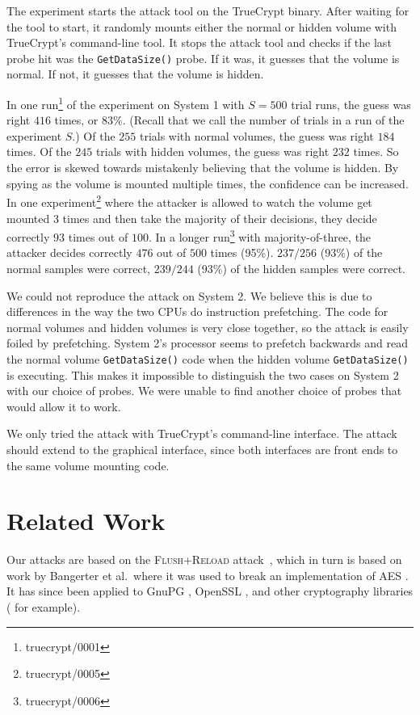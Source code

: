 \documentclass[letterpaper,twocolumn,10pt]{article}
\begin{document}
The experiment starts the attack tool on the TrueCrypt binary. After waiting for
the tool to start, it randomly mounts either the normal or hidden volume with
TrueCrypt's command-line tool. It stops the attack tool and checks if the last
probe hit was the \texttt{GetDataSize()} probe. If it was, it guesses that the
volume is normal. If not, it guesses that the volume is hidden.

In one run\footnote{truecrypt/0001} of the experiment on System 1 with $S=500$
trial runs, the guess was right $416$ times, or 83\%. (Recall that we call the
number of trials in a run of the experiment $S$.) Of the $255$ trials with
normal volumes, the guess was right $184$ times. Of the $245$ trials with hidden
volumes, the guess was right $232$ times. So the error is skewed towards
mistakenly believing that the volume is hidden. By spying as the volume is
mounted multiple times, the confidence can be increased. In one
experiment\footnote{truecrypt/0005} where the attacker is allowed to watch the
volume get mounted 3 times and then take the majority of their decisions, they
decide correctly $93$ times out of $100$. In a longer
run\footnote{truecrypt/0006} with majority-of-three, the attacker decides
correctly $476$ out of $500$ times (95\%). $237/256$ (93\%) of the normal
samples were correct, $239/244$ (93\%) of the hidden samples were correct.

We could not reproduce the attack on System 2. We believe this is due to
differences in the way the two CPUs do instruction prefetching. The code for
normal volumes and hidden volumes is very close together, so the attack is
easily foiled by prefetching. System 2's processor seems to prefetch backwards
and read the normal volume \texttt{GetDataSize()} code when the hidden volume
\texttt{GetDataSize()} is executing. This makes it impossible to distinguish the
two cases on System 2 with our choice of probes. We were unable to find another
choice of probes that would allow it to work.

We only tried the attack with TrueCrypt's command-line interface. The attack
should extend to the graphical interface, since both interfaces are front ends
to the same volume mounting code. 

\section{Related Work}
\label{sec:relwork}


Our attacks are based on the \textsc{Flush+Reload} attack~\cite{yarom2013flush},
which in turn is based on work by Bangerter et al.\ where it was used to break
an implementation of AES \cite{gullasch2011cache}. It has since been applied to
GnuPG \cite{yarom2013flush}, OpenSSL \cite{benger2014ooh, yarom2014recovering},
and other cryptography libraries (\cite{bruinderink2016flush} for example).
\end{document}
